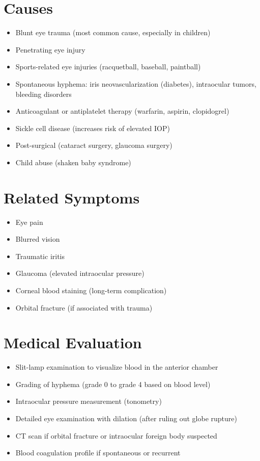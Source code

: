 \section*{Causes}
\begin{itemize}
\item Blunt eye trauma (most common cause, especially in children)
\item Penetrating eye injury
\item Sports-related eye injuries (racquetball, baseball, paintball)
\item Spontaneous hyphema: iris neovascularization (diabetes), intraocular tumors, bleeding disorders
\item Anticoagulant or antiplatelet therapy (warfarin, aspirin, clopidogrel)
\item Sickle cell disease (increases risk of elevated IOP)
\item Post-surgical (cataract surgery, glaucoma surgery)
\item Child abuse (shaken baby syndrome)
\end{itemize}

\section*{Related Symptoms}
\begin{itemize}
\item Eye pain
\item Blurred vision
\item Traumatic iritis
\item Glaucoma (elevated intraocular pressure)
\item Corneal blood staining (long-term complication)
\item Orbital fracture (if associated with trauma)
\end{itemize}

\section*{Medical Evaluation}
\begin{itemize}
\item Slit-lamp examination to visualize blood in the anterior chamber
\item Grading of hyphema (grade 0 to grade 4 based on blood level)
\item Intraocular pressure measurement (tonometry)
\item Detailed eye examination with dilation (after ruling out globe rupture)
\item CT scan if orbital fracture or intraocular foreign body suspected
\item Blood coagulation profile if spontaneous or recurrent
\end{itemize}

